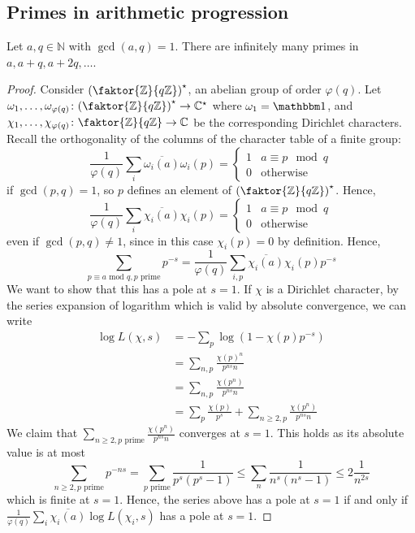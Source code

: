 \subsection{Primes in arithmetic progression}
\begin{theorem}[Dirichlet]
    Let \( a, q \in \mathbb N \) with \( \gcd(a,q) = 1 \).
    There are infinitely many primes in \( a, a + q, a + 2q, \dots \).
\end{theorem}
\begin{proof}
    Consider \( \qty(\faktor{\mathbb Z}{q\mathbb Z})^\star \), an abelian group of order \( \varphi(q) \).
    Let \( \omega_1, \dots, \omega_{\varphi(q)} \colon \qty(\faktor{\mathbb Z}{q\mathbb Z})^\star \to \mathbb C^\star \) where \( \omega_1 = \mathbbm 1 \), and \( \chi_1, \dots, \chi_{\varphi(q)} \colon \faktor{\mathbb Z}{q\mathbb Z} \to \mathbb C \) be the corresponding Dirichlet characters.
    Recall the orthogonality of the columns of the character table of a finite group:
    \[ \frac{1}{\varphi(q)} \sum_i \overline{\omega_i(a)} \omega_i(p) = \begin{cases}
        1 & a \equiv p \mod q \\
        0 & \text{otherwise}
    \end{cases} \]
    if \( \gcd(p, q) = 1 \), so \( p \) defines an element of \( \qty(\faktor{\mathbb Z}{q\mathbb Z})^\star \).
    Hence,
    \[ \frac{1}{\varphi(q)} \sum_i \overline{\chi_i(a)} \chi_i(p) = \begin{cases}
        1 & a \equiv p \mod q \\
        0 & \text{otherwise}
    \end{cases} \]
    even if \( \gcd(p, q) \neq 1 \), since in this case \( \chi_i(p) = 0 \) by definition.
    Hence,
    \[ \sum_{p \equiv a \text{ mod } q, p \text{ prime}} p^{-s} = \frac{1}{\varphi(q)} \sum_{i, p} \overline{\chi_i(a)} \chi_i(p) p^{-s} \]
    We want to show that this has a pole at \( s = 1 \).
    If \( \chi \) is a Dirichlet character, by the series expansion of logarithm which is valid by absolute convergence, we can write
    \begin{align*}
        \log L(\chi, s) &= -\sum_p \log(1 - \chi(p) p^{-s}) \\
        &= \sum_{n,p} \frac{\chi(p)^n}{p^{ns} n} \\
        &= \sum_{n,p} \frac{\chi(p^n)}{p^{ns} n} \\
        &= \sum_p \frac{\chi(p)}{p^s} + \sum_{n \geq 2, p} \frac{\chi(p^n)}{p^{ns} n}
    \end{align*}
    We claim that \( \sum_{n \geq 2, p \text{ prime}} \frac{\chi(p^n)}{p^{ns} n} \) converges at \( s = 1 \).
    This holds as its absolute value is at most
    \[ \sum_{n \geq 2, p \text{ prime}} p^{-ns} = \sum_{p \text{ prime}} \frac{1}{p^s(p^s - 1)} \leq \sum_n \frac{1}{n^s(n^s - 1)} \leq 2\frac{1}{n^{2s}} \]
    which is finite at \( s = 1 \).
    Hence, the series above has a pole at \( s = 1 \) if and only if \( \frac{1}{\varphi(q)} \sum_{i} \overline{\chi_i(a)} \log L(\chi_i, s) \) has a pole at \( s = 1 \).


\end{proof}
